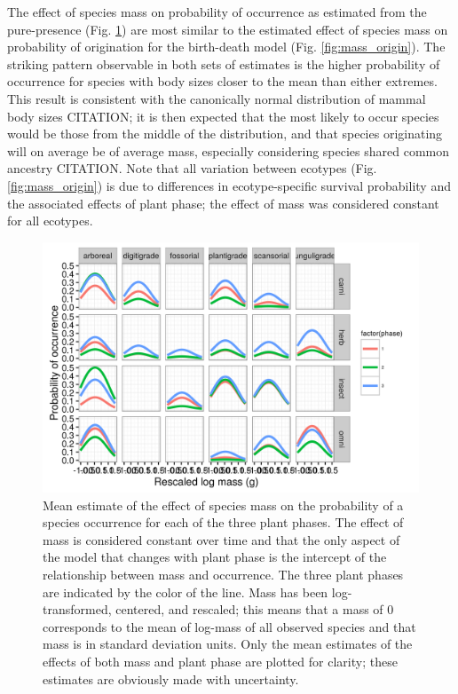 \documentclass[12pt,letterpaper]{article}
\begin{document}
The effect of species mass on probability of occurrence as estimated from the pure-presence (Fig. \ref{fig:mass_occur}) are most similar to the estimated effect of species mass on probability of origination for the birth-death model (Fig. \ref{fig:mass_origin}). The striking pattern observable in both sets of estimates is the higher probability of occurrence for species with body sizes closer to the mean than either extremes. This result is consistent with the canonically normal distribution of mammal body sizes CITATION; it is then expected that the most likely to occur species would be those from the middle of the distribution, and that species originating will on average be of average mass, especially considering species shared common ancestry CITATION. Note that all variation between ecotypes (Fig. \ref{fig:mass_origin}) is due to differences in ecotype-specific survival probability and the associated effects of plant phase; the effect of mass was considered constant for all ecotypes.

\begin{figure}[ht]
  \centering
  \includegraphics[width=\textwidth,height=0.5\textheight,keepaspectratio=true]{figure/mass_on_pres}
  \caption[Effect of mass on probability of species occurrence as estimated from the pure-presence model]{Mean estimate of the effect of species mass on the probability of a species occurrence for each of the three plant phases. The effect of mass is considered constant over time and that the only aspect of the model that changes with plant phase is the intercept of the relationship between mass and occurrence. The three plant phases are indicated by the color of the line. Mass has been log-transformed, centered, and rescaled; this means that a mass of 0 corresponds to the mean of log-mass of all observed species and that mass is in standard deviation units. Only the mean estimates of the effects of both mass and plant phase are plotted for clarity; these estimates are obviously made with uncertainty.}
  \label{fig:mass_occur}
\end{figure}
\end{document}
